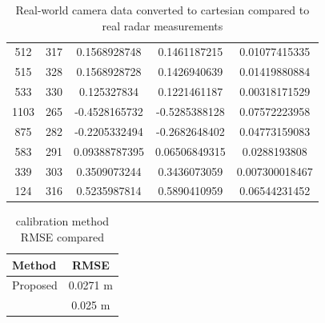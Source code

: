 \begin{table}[htbp]
\begin{tabular}{|c|c|c|c|c|}
        512 & 317 & 0.1568928748 & 0.1461187215 & 0.01077415335 \\
        515 & 328 & 0.1568928728 & 0.1426940639 & 0.01419880884 \\
        533 & 330 & 0.125327834 & 0.1221461187 & 0.00318171529 \\
        1103 & 265 & -0.4528165732 & -0.5285388128 & 0.07572223958 \\
        875 & 282 & -0.2205332494 & -0.2682648402 & 0.04773159083 \\
        583 & 291 & 0.09388787395 & 0.06506849315 & 0.0288193808 \\
        339 & 303 & 0.3509073244 & 0.3436073059 & 0.007300018467 \\
        124 & 316 & 0.5235987814 & 0.5890410959 & 0.06544231452 \\
    \hline
\end{tabular}
\caption{Real-world camera data converted to cartesian compared to real radar measurements}
\label{tab:cam_radar_data}
\end{table}

\begin{table}[h!]
    \begin{center}
      \label{tab:table4}
      \begin{tabular}{l|c} %
        \textbf{Method} & \textbf{RMSE} \\%
        \hline
        Proposed                            & 0.0271 m \\%
        \citeauthor{8794186}\cite{8794186}  & 0.025 m \\%
        
      \end{tabular}
    \end{center}
    \caption{calibration method RMSE compared}
    \label{tab:callib_rmse}
  \end{table}


\newpage
